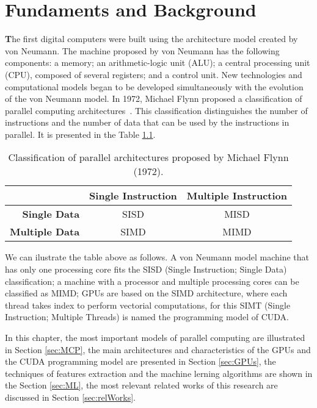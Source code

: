\chapter{Fundaments and Background}\label{chap:background}
\lettrine[findent=2pt]{\textbf{T}}{}he first digital computers were built using the architecture model created by von Neumann. The machine proposed by von Neumann has the following components: a memory; an arithmetic-logic unit (ALU); a central processing unit (CPU), composed of several registers; and a control unit. New technologies and computational models began to be developed simultaneously with the evolution of the von Neumann model. In 1972, Michael Flynn proposed a classification of parallel computing architectures~\citep{flynn1996parallel}. This classification distinguishes the number of instructions and the number of data that can be used by the instructions in parallel. It is presented in the Table \ref{tab:taxFlynn}.

\begin{table}[htpb]
\begin{center}
\begin{tabular}{|r|c|c|}
\hline
& \bf Single Instruction & \bf Multiple Instruction\\\hline 
\bf Single Data & SISD & MISD \\\hline 
\bf Multiple Data & SIMD & MIMD \\\hline 
\end{tabular}
\end{center}
\caption{Classification of parallel architectures proposed by Michael Flynn (1972).} 
\label{tab:taxFlynn}
\end{table}

We can ilustrate the table above as follows. A von Neumann model machine that has only one processing core fits the SISD (Single Instruction; Single Data) classification; a machine with a processor and multiple processing cores can be classified as MIMD; GPUs are based on the SIMD architecture, where each thread takes index to perform vectorial computations, for this SIMT (Single Instruction; Multiple Threads) is named the programming model of CUDA.

In this chapter, the  most important models of parallel computing are illustrated in Section \ref{sec:MCP}, the main architectures and characteristics of the GPUs and the CUDA programming model are presented in Section \ref{sec:GPUs}, the techniques of features extraction and the machine lerning algorithms are shown in the Section \ref{sec:ML}, the most relevant related works of this research are discussed in Section \ref{sec:relWorks}.

